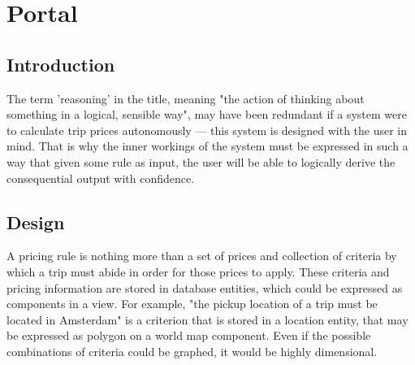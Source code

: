 \graphicspath{{Chapter5/Figs/Vector/}{Chapter5/Figs/}}

\chapter{Portal}


\section{Introduction}
The term 'reasoning' in the title, meaning "the action of thinking about something in a logical, sensible way", may have been redundant if a system were to calculate trip prices autonomously --- this system is designed with the user in mind. That is why the inner workings of the system must be expressed in such a way that given some rule as input, the user will be able to logically derive the consequential output with confidence.

%
\section{Design}
A pricing rule is nothing more than a set of prices and collection of criteria by which a trip must abide in order for those prices to apply. These criteria and pricing information are stored in database entities, which could be expressed as components in a view. For example, "the pickup location of a trip must be located in Amsterdam" is a criterion that is stored in a location entity, that may be expressed as polygon on a world map component. Even if the possible combinations of criteria could be graphed, it would be highly dimensional.

